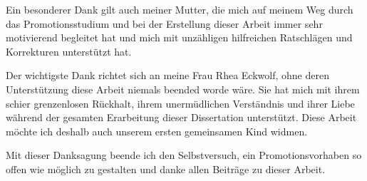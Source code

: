 Ein besonderer Dank gilt auch meiner Mutter, die mich auf meinem Weg durch das Promotionsstudium und bei der Erstellung dieser Arbeit immer sehr motivierend begleitet hat und mich mit unzähligen hilfreichen Ratschlägen und Korrekturen unterstützt hat.

Der wichtigste Dank richtet sich an meine Frau Rhea Eckwolf, ohne deren Unterstützung diese Arbeit niemals beended worde wäre. Sie hat mich mit ihrem schier grenzenlosen Rückhalt, ihrem unermüdlichen Verständnis und ihrer Liebe während der gesamten Erarbeitung dieser Dissertation unterstützt. Diese Arbeit möchte ich deshalb auch unserem ersten gemeinsamen Kind widmen.

Mit dieser Danksagung beende ich den Selbstversuch, ein Promotionsvorhaben so offen wie möglich zu gestalten und danke allen Beiträge zu dieser Arbeit.
